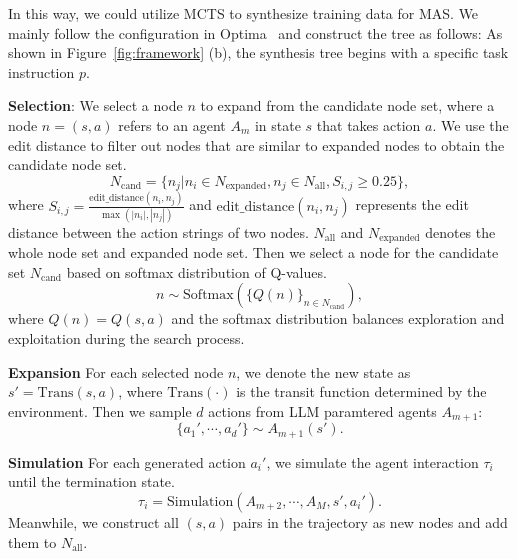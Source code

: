 
In this way, we could utilize MCTS to synthesize training data for MAS. We mainly follow the configuration in Optima~\cite{DBLP:journals/corr/abs-2410-08115} and construct the tree as follows: As shown in Figure~\ref{fig:framework} (b), the synthesis tree begins with a specific task instruction $p$. 

\textbf{Selection}: We select a node $n$ to
expand from the candidate node set, where a node $n=(s,a)$ refers to an agent $A_m$ in state $s$ that takes action $a$. We use the edit distance to filter out nodes that are similar to expanded nodes to obtain the candidate node set.
\begin{equation}   
    N_{\text{cand}} = \{n_j| n_i \in N_{\text{expanded}}, n_j\in N_{\text{all}}, S_{i,j} \geq 0.25 \},
\end{equation}
where $S_{i,j}=\frac{\text{edit\_distance}(n_i, n_j)}{\max (|n_i|,|n_j|)}$ and $\text{edit\_distance}(n_i, n_j)$ represents the edit distance between the action strings of two nodes. $N_\text{all}$ and $N_{\text{expanded}}$ denotes the whole node set and expanded node set. Then we select a node for the candidate set $N_{\text{cand}}$ based on softmax distribution of Q-values.
\begin{equation}
n\sim \text{Softmax}(\{Q(n)\}_{n\in N_{\text{cand}}}),
\end{equation}
where $Q(n) = Q(s, a)$ and the softmax distribution balances exploration and exploitation during the search process.


\textbf{Expansion} For each selected node $n$, we denote the new state as $s'=\text{Trans}(s, a)$, where $\text{Trans}(\cdot)$ is the transit function determined by the environment. Then we sample $d$ actions from LLM paramtered agents $A_{m+1}$: 
\begin{equation}
    \{a_1', \cdots, a_d' \} \sim A_{m+1}(s').
\end{equation}

\textbf{Simulation} For each generated action $a_i'$, we simulate the agent interaction $\tau_i$ until the termination state.
\begin{equation}
    \tau_i = \text{Simulation}(A_{m+2}, \cdots, A_{M}, s', a_i').
\end{equation}
Meanwhile, we construct all $(s, a)$ pairs in the trajectory as new nodes and add them to $N_{\text{all}}$.


